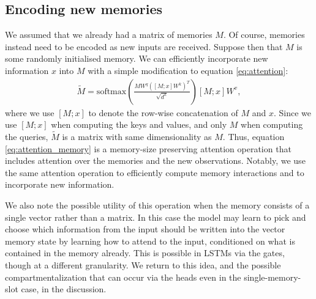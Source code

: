 \documentclass{article}
\begin{document}
\subsection{Encoding new memories}
We assumed that we already had a matrix of memories $M$. Of course, memories instead need to be encoded as new inputs are received. Suppose then that $M$ is some randomly initialised memory. We can efficiently incorporate new information $x$ into $M$ with a simple modification to equation \ref{eq:attention}:
\begin{align}
\widetilde{M} = \text{softmax} \left( \frac{MW^q([M;x]W^k)^T}{\sqrt{d^k}} \right) [M;x]W^v, \label{eq:attention_memory}
\end{align}
where we use $[M;x]$ to denote the row-wise concatenation of $M$ and $x$. Since we use $[M;x]$ when computing the keys and values, and only $M$ when computing the queries, $\widetilde{M}$ is a matrix with same dimensionality as $M$. Thus, equation \ref{eq:attention_memory} is a memory-size preserving attention operation that includes attention over the memories and the new observations. Notably, we use the same attention operation to efficiently compute memory interactions and to incorporate new information. 

We also note the possible utility of this operation when the memory consists of a single vector rather than a matrix. In this case the model may learn to pick and choose which information from the input should be written into the vector memory state by learning how to attend to the input, conditioned on what is contained in the memory already. This is possible in LSTMs via the gates, though at a different granularity. We return to this idea, and the possible compartmentalization that can occur via the heads even in the single-memory-slot case, in the discussion. 
\end{document}
